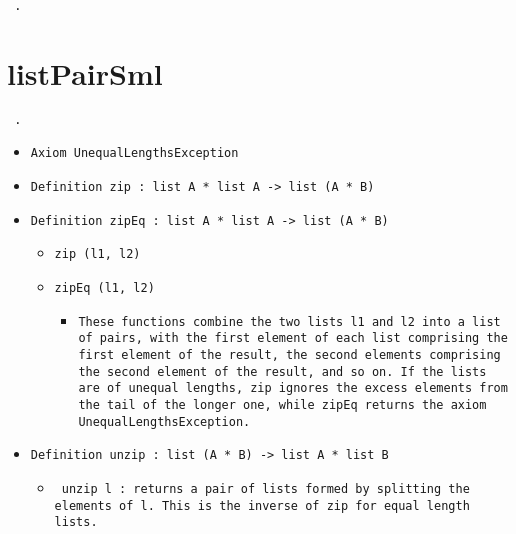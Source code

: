 \documentclass[11pt]{report}
\begin{document}
\begin{coqdoccode}
\coqdocemptyline
\coqdocemptyline
\coqdocnoindent
\texttt{ .\coqdoceol}
\coqdocemptyline
\end{coqdoccode}
\section*{listPairSml}

\begin{coqdoccode}
\coqdocemptyline
\coqdocnoindent
\texttt{ .\coqdoceol}
\coqdocemptyline
\end{coqdoccode}

\begin{itemize}
\item  \texttt{Axiom  UnequalLengthsException}

\item  \texttt{Definition zip : list A * list A -> list (A * B)}

\item  \texttt{Definition zipEq : list A * list A -> list (A * B)}

\begin{itemize}
\item \texttt{zip (l1, l2)} 
\item \texttt{zipEq (l1, l2)}

\begin{itemize}
\item \begin{flushleft} \texttt{These functions combine the two lists l1 and l2 into a list of pairs, with the first element of each list comprising the first element of the result, the second elements comprising the second element of the result, and so on. If the lists are of unequal lengths, zip ignores the excess elements from the tail of the longer one, while zipEq returns the axiom UnequalLengthsException.} \end{flushleft}
\end{itemize}

\end{itemize}

\item  \texttt{Definition unzip : list (A * B) -> list A * list B}

\begin{itemize}
\item  \texttt{ unzip l : returns a pair of lists formed by splitting the elements of l. This is the inverse of zip for equal length lists.}




\end{itemize}
\end{itemize}
\end{document}
